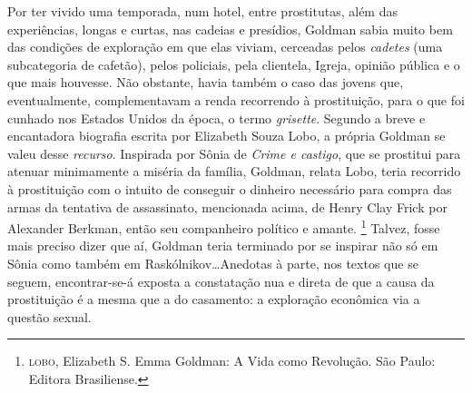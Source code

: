 Por ter vivido uma temporada, num hotel, entre prostitutas, além das
experiências, longas e curtas, nas cadeias e presídios, Goldman sabia
muito bem das condições de exploração em que elas viviam, cerceadas
pelos \textit{cadetes} (uma subcategoria de cafetão), pelos policiais, pela
clientela, Igreja, opinião pública e o que mais houvesse. Não obstante,
havia também o caso das jovens que, eventualmente, complementavam a
renda recorrendo à prostituição, para o que foi cunhado nos Estados
Unidos da época, o termo \textit{grisette}. Segundo a breve e encantadora
biografia escrita por Elizabeth Souza Lobo, a própria Goldman se valeu
desse \textit{recurso}. Inspirada por Sônia de \textit{Crime e castigo}, que se
prostitui para atenuar minimamente a miséria da família, Goldman, relata
Lobo, teria recorrido à prostituição com o intuito de conseguir o
dinheiro necessário para compra das armas da tentativa de assassinato,
mencionada acima, de Henry Clay Frick por Alexander Berkman, então seu
companheiro político e amante. \footnote{\textsc{lobo}, Elizabeth S. Emma
  Goldman: A Vida como Revolução. São Paulo: Editora Brasiliense.}
Talvez, fosse mais preciso dizer que aí, Goldman teria terminado por se
inspirar não só em Sônia como também em Raskólnikov\ldots Anedotas à parte,
nos textos que se seguem, encontrar-se-á exposta a constatação nua e
direta de que a causa da prostituição é a mesma que a do casamento: a
exploração econômica via a questão sexual.

